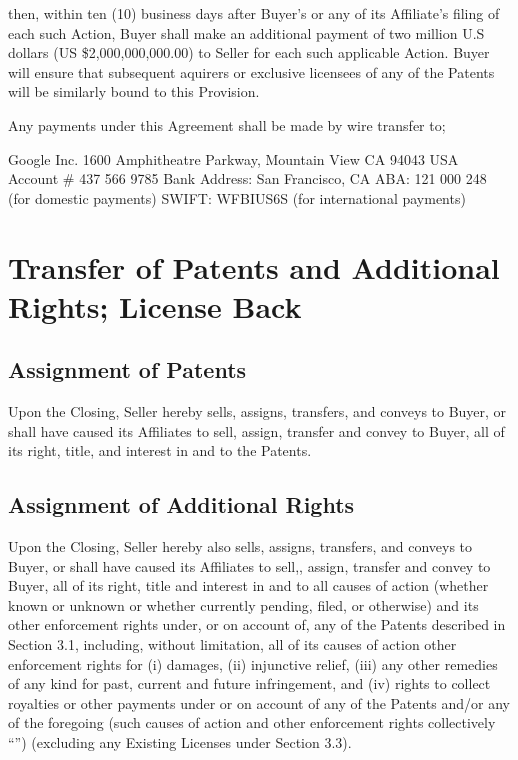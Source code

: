 \documentclass[letterpaper,10pt,english]{sphinxmanual}
\begin{document}
then, within ten (10) business days after Buyer’s or any of its Affiliate’s filing of each such Action, Buyer shall make an additional payment of two million U.S dollars (US \$2,000,000,000.00) to Seller for each such applicable Action. Buyer will ensure that subsequent aquirers or exclusive licensees of any of the Patents will be similarly bound to this Provision.

Any payments under this Agreement shall be made by wire transfer to;

Google Inc.
1600 Amphitheatre Parkway, Mountain View CA 94043 USA
Account \# 437 566 9785
Bank Address: San Francisco, CA
ABA: 121 000 248 (for domestic payments)
SWIFT: WFBIUS6S (for international payments)


\section{Transfer of Patents and Additional Rights; License Back}
\label{\detokenize{3-transfer:transfer-of-patents-and-additional-rights-license-back}}\label{\detokenize{3-transfer::doc}}

\subsection{Assignment of Patents}
\label{\detokenize{3-transfer:assignment-of-patents}}
Upon the Closing, Seller hereby sells, assigns, transfers, and conveys to Buyer, or shall have caused its Affiliates to sell, assign, transfer and convey to Buyer, all of its right, title, and interest in and to the Patents.


\subsection{Assignment of Additional Rights}
\label{\detokenize{3-transfer:assignment-of-additional-rights}}
Upon the Closing, Seller hereby also sells, assigns, transfers, and conveys to Buyer, or shall have caused its Affiliates to sell,, assign, transfer and convey to Buyer, all of its right, title and interest in and to all causes of action (whether known or unknown or whether currently pending, filed, or otherwise) and its other enforcement rights under, or on account of, any of the Patents described in Section 3.1, including, without limitation, all of its causes of action other enforcement rights for (i) damages, (ii) injunctive relief, (iii) any other remedies of any kind for past, current and future infringement, and (iv) rights to collect royalties or other payments under or on account of any of the Patents and/or any of the foregoing (such causes of action and other enforcement rights collectively “”) (excluding any Existing Licenses under Section 3.3).
\end{document}
